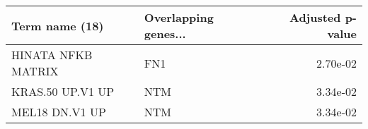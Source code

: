 \begin{tabular}{llr}
\toprule
    Term name (18) & Overlapping genes... &  Adjusted p-value \\
\midrule
HINATA NFKB MATRIX &                  FN1 &          2.70e-02 \\
  KRAS.50 UP.V1 UP &                  NTM &          3.34e-02 \\
    MEL18 DN.V1 UP &                  NTM &          3.34e-02 \\
\bottomrule
\end{tabular}
